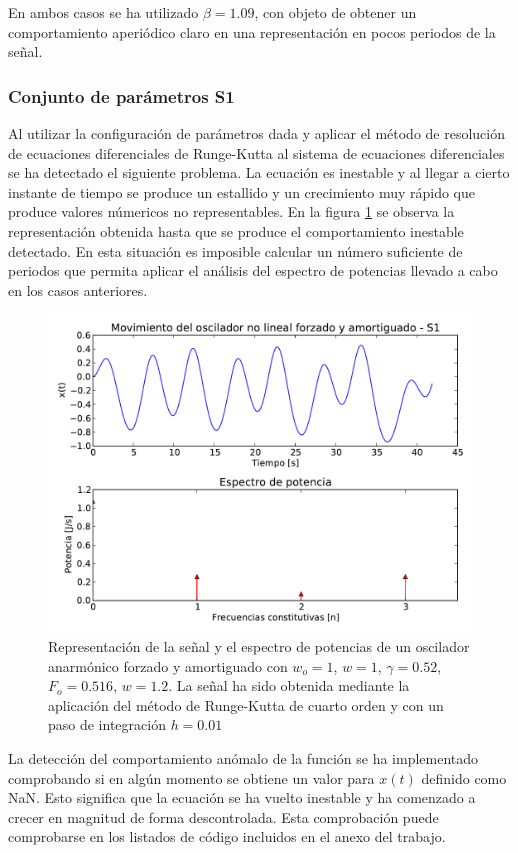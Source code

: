 \documentclass[11pt]{article}
\begin{document}
En ambos casos se ha utilizado $\beta=1.09$, con objeto de obtener un
comportamiento aperiódico claro en una representación en pocos periodos de la
señal.

\subsubsection{Conjunto de parámetros S1}
Al utilizar la configuración de parámetros dada y aplicar el método de
resolución de ecuaciones diferenciales de Runge-Kutta al sistema de ecuaciones
diferenciales se ha detectado el siguiente problema. La ecuación es inestable y
al llegar a cierto instante de tiempo se produce un estallido y un crecimiento
muy rápido que produce valores númericos no representables. En la figura
\ref{fig:caso_anarmonico_s1} se observa la representación obtenida hasta que se
produce el comportamiento inestable detectado. En esta situación es imposible
calcular un número suficiente de periodos que permita aplicar el análisis del
espectro de potencias llevado a cabo en los casos anteriores.

\begin{figure}
\centering
\includegraphics[width=0.75\linewidth]{caso_anarmonico_s1.pdf}
\caption{Representación de la señal y el espectro de potencias de un oscilador
anarmónico forzado y amortiguado con $w_o = 1$, $w = 1$, $\gamma = 0.52$,
$F_o = 0.516$, $w = 1.2$. La señal ha sido obtenida mediante la aplicación del
método de Runge-Kutta de cuarto orden y con un paso de integración $h = 0.01$}
\label{fig:caso_anarmonico_s1}
\end{figure}

La detección del comportamiento anómalo de la función se ha implementado
comprobando si en algún momento se obtiene un valor para $x(t)$ definido 
como NaN. Esto significa que la ecuación se ha vuelto inestable y ha comenzado 
a crecer en magnitud de forma descontrolada. Esta comprobación puede comprobarse
en los listados de código incluidos en el anexo del trabajo.
\end{document}
